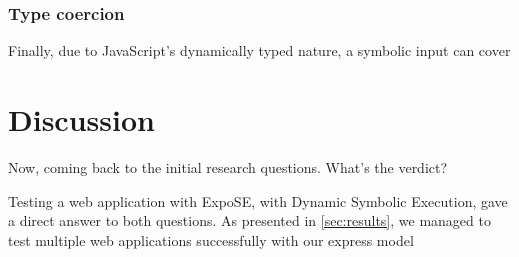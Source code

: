 \subsubsection{Type coercion}
Finally, due to JavaScript's dynamically typed nature, a symbolic input can cover 


\section{Discussion}
Now, coming back to the initial research questions. What's the verdict? 

Testing a web application with ExpoSE, with Dynamic Symbolic Execution, gave a direct answer to both questions. As presented in \autoref{sec:results}, we managed to test multiple web applications successfully with our express model 
